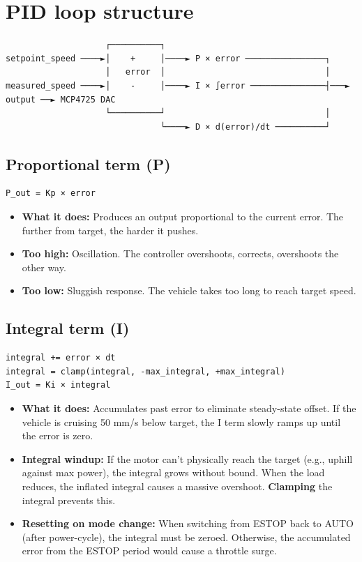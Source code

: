 \documentclass[12pt,a4paper,oneside]{report}
\providecommand{\tightlist}{\setlength{\itemsep}{0pt}\setlength{\parskip}{0pt}}
\begin{document}
\section{PID loop structure}\label{pid-loop-structure}

\begin{verbatim}
                    ┌──────────┐
setpoint_speed ────►│    +     │────► P × error ────────────────┐
                    │   error  │                                │
measured_speed ────►│    -     │────► I × ∫error ───────────────┤───► output ──► MCP4725 DAC
                    └──────────┘                                │
                               └────► D × d(error)/dt ──────────┘
\end{verbatim}

\subsection{Proportional term (P)}\label{proportional-term-p}

\begin{verbatim}
P_out = Kp × error
\end{verbatim}

\begin{itemize}
\tightlist
\item
  \textbf{What it does:} Produces an output proportional to the current error.
  The further from target, the harder it pushes.
\item
  \textbf{Too high:} Oscillation. The controller overshoots, corrects,
  overshoots the other way.
\item
  \textbf{Too low:} Sluggish response. The vehicle takes too long to reach
  target speed.
\end{itemize}

\subsection{Integral term (I)}\label{integral-term-i}

\begin{verbatim}
integral += error × dt
integral = clamp(integral, -max_integral, +max_integral)
I_out = Ki × integral
\end{verbatim}

\begin{itemize}
\tightlist
\item
  \textbf{What it does:} Accumulates past error to eliminate steady-state
  offset. If the vehicle is cruising 50 mm/s below target, the I term slowly
  ramps up until the error is zero.
\item
  \textbf{Integral windup:} If the motor can't physically reach the target
  (e.g., uphill against max power), the integral grows without bound. When the
  load reduces, the inflated integral causes a massive overshoot.
  \textbf{Clamping} the integral prevents this.
\item
  \textbf{Resetting on mode change:} When switching from ESTOP back to AUTO
  (after power-cycle), the integral must be zeroed. Otherwise, the accumulated
  error from the ESTOP period would cause a throttle surge.
\end{itemize}
\end{document}
